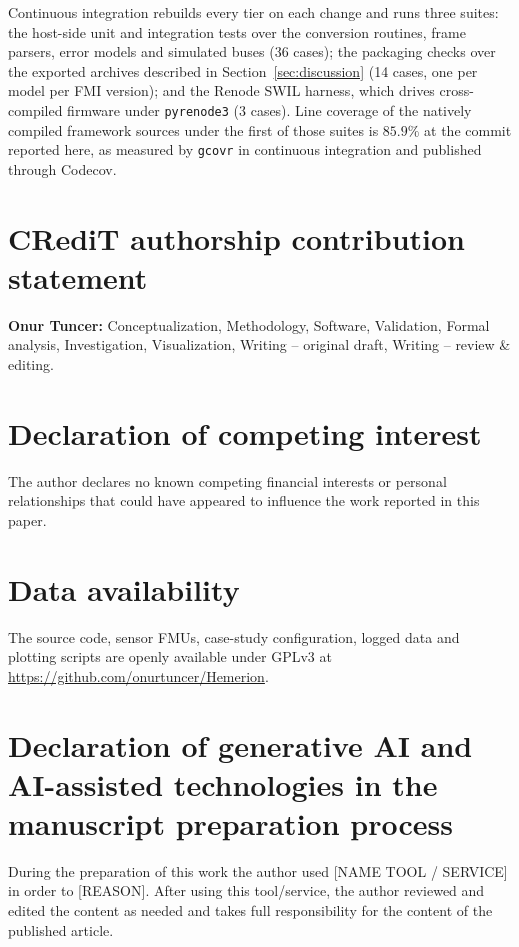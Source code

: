 \documentclass[preprint,12pt,a4paper]{elsarticle}
\newcommand{\code}[1]{\texttt{\small #1}}
\begin{document}
Continuous integration rebuilds every tier on each change and runs three
suites: the host-side unit and integration tests over the conversion routines,
frame parsers, error models and simulated buses (36 cases); the packaging checks over the
exported archives described in Section~\ref{sec:discussion} (14 cases, one per
model per FMI version); and the Renode SWIL harness, which drives
cross-compiled firmware under \code{pyrenode3} (3 cases). Line coverage of the
natively compiled framework sources under the first of those suites is
$85.9\%$ at the commit reported here, as measured by \code{gcovr} in
continuous integration and published through Codecov.

\section*{CRediT authorship contribution statement}
\textbf{Onur Tuncer:} Conceptualization, Methodology, Software, Validation,
Formal analysis, Investigation, Visualization, Writing -- original draft,
Writing -- review \& editing.

\section*{Declaration of competing interest}
The author declares no known competing financial interests or personal
relationships that could have appeared to influence the work reported
in this paper.

\section*{Data availability}
The source code, sensor FMUs, case-study configuration, logged data and
plotting scripts are openly available under GPLv3 at
\url{https://github.com/onurtuncer/Hemerion}.

\section*{Declaration of generative AI and AI-assisted technologies in the
manuscript preparation process}
During the preparation of this work the author used [NAME TOOL / SERVICE] in
order to [REASON]. After using this tool/service, the author reviewed and
edited the content as needed and takes full responsibility for the content of
the published article.
\end{document}

